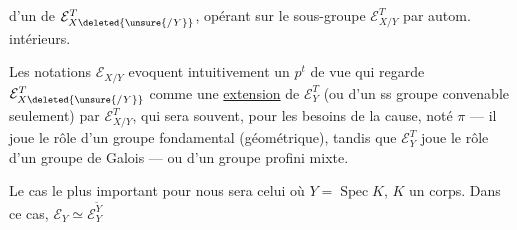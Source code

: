 
d'un  de $\mathcal E_{X\deleted{\unsure{/Y}}}^T$, opérant sur le sous-groupe $\mathcal E_{X/Y}^T$ par autom. intérieurs.

Les notations  $\mathcal E_{X/Y}$ evoquent intuitivement un $p^t$ de vue qui regarde $\mathcal E_{X\deleted{\unsure{/Y}}}^T$ comme une \uline{extension} de $\mathcal E_Y^T$ (ou d'un ss groupe convenable seulement) par $\mathcal E_{X/Y}^T$, qui sera souvent, pour les besoins de la cause, noté $\pi$ --- il joue le rôle d'un groupe fondamental (géométrique), tandis que $\mathcal E_Y^T$ joue le rôle d'un groupe de Galois --- ou d'un groupe profini mixte.


Le cas le plus important pour nous sera celui où $Y=\operatorname{Spec}K$, $K$ un corps.  Dans ce cas, $\mathcal E_Y\simeq\mathcal E_Y^{\widetilde Y}$

